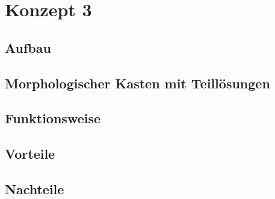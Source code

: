 \section{Konzept 3}

\subsection{Aufbau}

\subsection{Morphologischer Kasten mit Teill\"{o}sungen}

\subsection{Funktionsweise}

\subsection{Vorteile}

\subsection{Nachteile}
